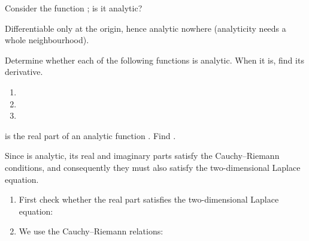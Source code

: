 \begin{EMexample}{}

Consider the function ; is it analytic?

Differentiable only at the origin, hence analytic nowhere (analyticity needs a whole neighbourhood).

\end{EMexample}

\begin{EMexercise}{}

Determine whether each of the following functions is analytic. When it is, find its derivative.

\begin{enumerate}
\def\labelenumi{\arabic{enumi}.}
\tightlist
\item
\item
\item
\end{enumerate}

\end{EMexercise}

\EMhold


\begin{EMexample}{}

 is the real part of an analytic function . Find .

Since  is analytic, its real and imaginary parts satisfy the Cauchy--Riemann conditions, and consequently they must also satisfy the two-dimensional Laplace equation.

\begin{enumerate}
\def\labelenumi{\arabic{enumi})}
\item
  First check whether the real part satisfies the two-dimensional Laplace equation:
\item
  We use the Cauchy--Riemann relations:
\end{enumerate}

\end{EMexample}

